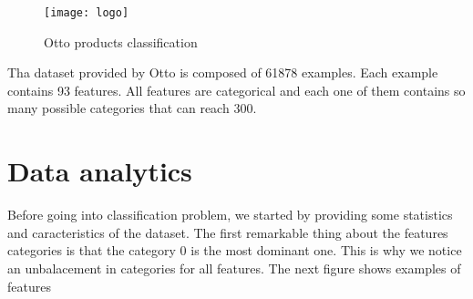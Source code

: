 \documentclass[a4paper,english,12pt]{article}
\begin{document}
\begin{figure}[H]
	\centering
	\texttt{[image: logo]}
	\caption{Otto products classification}
\end{figure}


Tha dataset provided by Otto is composed of 61878 examples. Each example contains 93 features. All features are categorical and each one of them contains so many possible categories that can reach 300.

\section{Data analytics}

Before going into classification problem, we started by providing some statistics and caracteristics of the dataset. The first remarkable thing about the features categories is that the category 0 is the most dominant one. This is why we notice an unbalacement in categories for all features. The next figure shows examples of features
\end{document}
